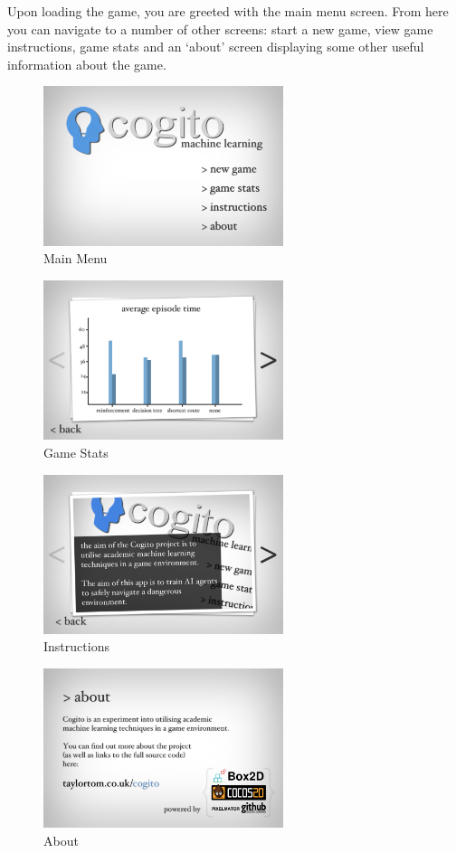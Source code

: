 \documentclass[a4paper,oneside]{report}
\begin{document}
Upon loading the game, you are greeted with the main menu screen. From here you can navigate to a number of other screens: start a new game, view game instructions, game stats and an `about' screen displaying some other useful information about the game.

\begin{figure}[h!]
  \centering
    \includegraphics[width=70mm]{sources/images/Menu}
    \caption{Main Menu}
\end{figure}

\begin{figure}[h!]
  \centering
    \includegraphics[width=70mm]{sources/images/Stats}
    \caption{Game Stats}
\end{figure}

\begin{figure}[h!]
  \centering
    \includegraphics[width=70mm]{sources/images/Instructions}
    \caption{Instructions}
\end{figure}

\begin{figure}[h!]
  \centering
    \includegraphics[width=70mm]{sources/images/About}
    \caption{About}
\end{figure}
\end{document}
